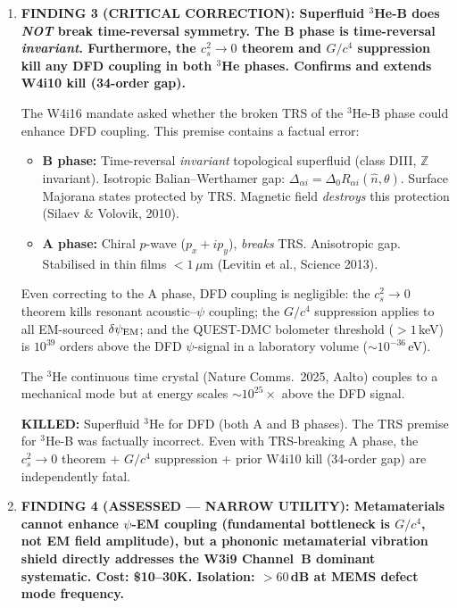 \documentclass[11pt]{article}
\theoremstyle{definition}
\theoremstyle{remark}
\newcommand{\dpsi}{\delta\psi_{\rm EM}}
\newcommand{\killed}[1]{\textcolor{red!70!black}{\textbf{KILLED:} #1}}
\newcommand{\verdict}[1]{\textcolor{green!50!black}{\textbf{VERDICT:} #1}}
\begin{document}
\begin{tcolorbox}[colback=blue!5!white, colframe=blue!50!black,
  title=\textbf{W4i16 TOP 5 FINDINGS --- Ranked by Programme Impact}]
\begin{enumerate}
\verdict{Diamond NV centres are a \textit{support tool} for SQMS Phase~I
(magnetic field mapping at \$5--10K). They have zero $\psi$-detection
capability (49-order gap). Not a detection instrument.}

\item \textbf{FINDING 3 (CRITICAL CORRECTION): Superfluid $^3$He-B
does \textit{NOT} break time-reversal symmetry. The B phase is
time-reversal \textit{invariant}. Furthermore, the $c_s^2 \to 0$ theorem
and $G/c^4$ suppression kill any DFD coupling in both $^3$He phases.
Confirms and extends W4i10 kill (34-order gap).}

The W4i16 mandate asked whether the broken TRS of the $^3$He-B phase
could enhance DFD coupling. This premise contains a factual error:

\begin{itemize}[nosep]
\item \textbf{B phase:} Time-reversal \textit{invariant} topological
  superfluid (class DIII, $\mathbb{Z}$ invariant). Isotropic
  Balian--Werthamer gap: $\Delta_{\alpha i} = \Delta_0 R_{\alpha i}
  (\hat{n}, \theta)$. Surface Majorana states protected by TRS.
  Magnetic field \textit{destroys} this protection (Silaev \& Volovik,
  2010).
\item \textbf{A phase:} Chiral $p$-wave ($p_x + ip_y$), \textit{breaks}
  TRS. Anisotropic gap. Stabilised in thin films $< 1$\,$\mu$m
  (Levitin et al., Science 2013).
\end{itemize}

Even correcting to the A phase, DFD coupling is negligible:
the $c_s^2 \to 0$ theorem kills resonant acoustic--$\psi$ coupling;
the $G/c^4$ suppression applies to all EM-sourced $\dpsi$; and the
QUEST-DMC bolometer threshold ($> 1$\,keV) is $10^{39}$ orders above
the DFD $\psi$-signal in a laboratory volume ($\sim 10^{-36}$\,eV).

The $^3$He continuous time crystal (Nature Comms.\ 2025, Aalto) couples
to a mechanical mode but at energy scales $\sim 10^{25}\times$ above the
DFD signal.

\killed{Superfluid $^3$He for DFD (both A and B phases). The TRS
premise for $^3$He-B was factually incorrect. Even with TRS-breaking
A phase, the $c_s^2 \to 0$ theorem + $G/c^4$ suppression + prior
W4i10 kill (34-order gap) are independently fatal.}

\item \textbf{FINDING 4 (ASSESSED --- NARROW UTILITY): Metamaterials
cannot enhance $\psi$-EM coupling (fundamental bottleneck is $G/c^4$,
not EM field amplitude), but a phononic metamaterial vibration shield
directly addresses the W3i9 Channel~B dominant systematic. Cost:
\$10--30K. Isolation: $> 60$\,dB at MEMS defect mode frequency.}


\end{enumerate}
\end{tcolorbox}
\end{document}
